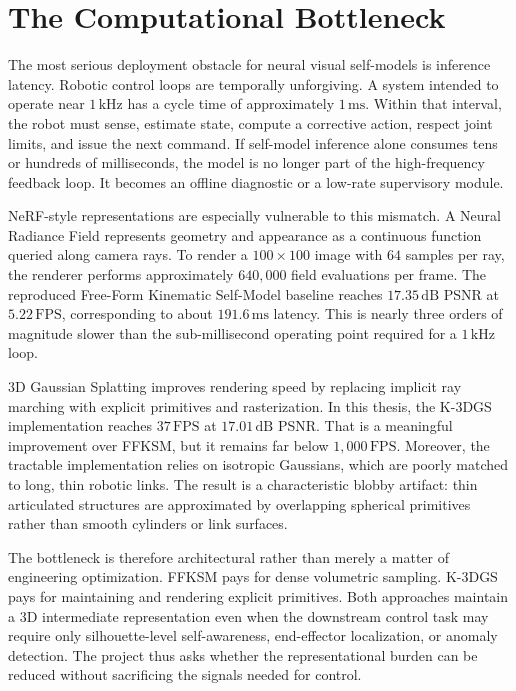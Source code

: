 \documentclass[12pt,a4paper,oneside]{report}
\begin{document}
\section{The Computational Bottleneck}

The most serious deployment obstacle for neural visual self-models is inference latency. Robotic control loops are temporally unforgiving. A system intended to operate near $1\,\mathrm{kHz}$ has a cycle time of approximately $1\,\mathrm{ms}$. Within that interval, the robot must sense, estimate state, compute a corrective action, respect joint limits, and issue the next command. If self-model inference alone consumes tens or hundreds of milliseconds, the model is no longer part of the high-frequency feedback loop. It becomes an offline diagnostic or a low-rate supervisory module.

NeRF-style representations are especially vulnerable to this mismatch. A Neural Radiance Field represents geometry and appearance as a continuous function queried along camera rays. To render a $100 \times 100$ image with $64$ samples per ray, the renderer performs approximately $640{,}000$ field evaluations per frame. The reproduced Free-Form Kinematic Self-Model baseline reaches $17.35\,\mathrm{dB}$ PSNR at $5.22\,\mathrm{FPS}$, corresponding to about $191.6\,\mathrm{ms}$ latency. This is nearly three orders of magnitude slower than the sub-millisecond operating point required for a $1\,\mathrm{kHz}$ loop.

3D Gaussian Splatting improves rendering speed by replacing implicit ray marching with explicit primitives and rasterization. In this thesis, the K-3DGS implementation reaches $37\,\mathrm{FPS}$ at $17.01\,\mathrm{dB}$ PSNR. That is a meaningful improvement over FFKSM, but it remains far below $1{,}000\,\mathrm{FPS}$. Moreover, the tractable implementation relies on isotropic Gaussians, which are poorly matched to long, thin robotic links. The result is a characteristic blobby artifact: thin articulated structures are approximated by overlapping spherical primitives rather than smooth cylinders or link surfaces.

The bottleneck is therefore architectural rather than merely a matter of engineering optimization. FFKSM pays for dense volumetric sampling. K-3DGS pays for maintaining and rendering explicit primitives. Both approaches maintain a 3D intermediate representation even when the downstream control task may require only silhouette-level self-awareness, end-effector localization, or anomaly detection. The project thus asks whether the representational burden can be reduced without sacrificing the signals needed for control.
\end{document}
